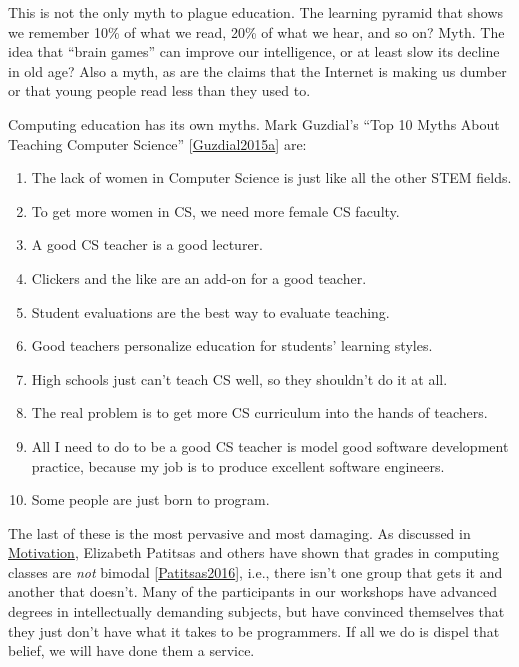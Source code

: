 \documentclass[10pt,statementpaper]{memoir}
\begin{document}
This is not the only myth to plague education. The learning pyramid that
shows we remember 10\% of what we read, 20\% of what we hear, and so on?
Myth. The idea that ``brain games'' can improve our intelligence, or at
least slow its decline in old age? Also a myth, as are the claims that
the Internet is making us dumber or that young people read less than
they used to.

Computing education has its own myths. Mark Guzdial's ``Top 10 Myths
About Teaching Computer Science''
{[}\href{biblio.html\#guzdial-top10}{Guzdial2015a}{]} are:

\begin{enumerate}
\def\labelenumi{\arabic{enumi}.}
\item
  The lack of women in Computer Science is just like all the other STEM
  fields.
\item
  To get more women in CS, we need more female CS faculty.
\item
  A good CS teacher is a good lecturer.
\item
  Clickers and the like are an add-on for a good teacher.
\item
  Student evaluations are the best way to evaluate teaching.
\item
  Good teachers personalize education for students' learning styles.
\item
  High schools just can't teach CS well, so they shouldn't do it at all.
\item
  The real problem is to get more CS curriculum into the hands of
  teachers.
\item
  All I need to do to be a good CS teacher is model good software
  development practice, because my job is to produce excellent software
  engineers.
\item
  Some people are just born to program.
\end{enumerate}

The last of these is the most pervasive and most damaging. As discussed
in \href{motivation.html}{Motivation}, Elizabeth Patitsas and others
have shown that grades in computing classes are \emph{not} bimodal
{[}\href{biblio.html\#patitsas-cs-grades}{Patitsas2016}{]}, i.e., there
isn't one group that gets it and another that doesn't. Many of the
participants in our workshops have advanced degrees in intellectually
demanding subjects, but have convinced themselves that they just don't
have what it takes to be programmers. If all we do is dispel that
belief, we will have done them a service.
\end{document}
